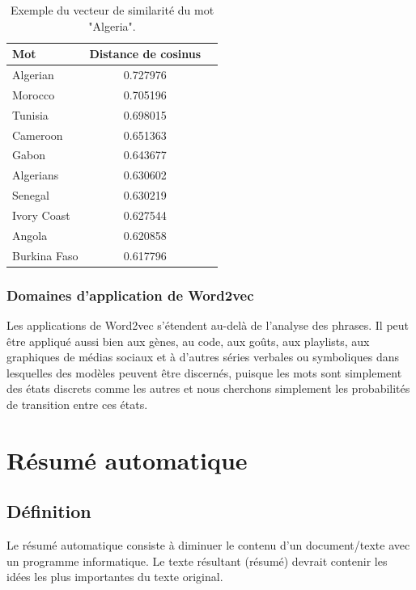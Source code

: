     \begin{table}[h!]
        \centering
                 \begin{tabular}{|l|c|r|}
                    \hline
                    Mot & Distance de cosinus\\
                    \hline
                    Algerian & 0.727976 \\
                    Morocco & 0.705196 \\
                    Tunisia & 0.698015 \\
                    Cameroon & 0.651363 \\
                    Gabon & 0.643677 \\ 
                    Algerians & 0.630602 \\
                    Senegal & 0.630219 \\
                    Ivory Coast & 0.627544 \\
                    Angola & 0.620858 \\
                    Burkina Faso & 0.617796 \\
                    \hline
                 \end{tabular}
             \caption{Exemple du vecteur de similarité du mot "Algeria".}
             \label{table:1}
         \end{table}
             
    
    
    
    \subsubsection{Domaines d'application de Word2vec}
    Les applications de Word2vec s'étendent au-delà de l'analyse des phrases. Il peut être appliqué aussi bien aux gènes, au code, aux goûts, aux playlists, aux graphiques de médias sociaux et à d'autres séries verbales ou symboliques dans lesquelles des modèles peuvent être discernés, puisque les mots sont simplement des états discrets comme les autres et nous cherchons simplement les probabilités de transition entre ces états.
    
    

\section{Résumé automatique}
    \subsection{Définition}
    Le résumé automatique consiste à diminuer le contenu d'un document/texte avec un programme informatique. Le texte résultant (résumé) devrait contenir les idées les plus importantes du texte original.

